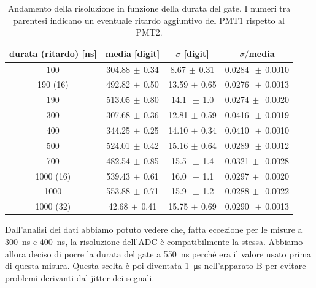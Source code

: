 \begin{table}[h]
\centering
\begin{tabular}{c|c|c|c}
durata (ritardo) [ns] & media [digit] & $\sigma$ [digit] & $\sigma\!/$\!media\\
\hline
 100 &    304.88$\,\pm\,$0.34 &  8.67$\,\pm\,$0.31 & 0.0284 $\,\pm\,$0.0010 \\  
 190 (16)&492.82$\,\pm\,$0.50 & 13.59$\,\pm\,$0.65 & 0.0276 $\,\pm\,$0.0013 \\
 190 &    513.05$\,\pm\,$0.80 & 14.1 $\,\pm\,$1.0 & 0.0274$\,\pm\,$  0.0020 \\
 300 &    307.68$\,\pm\,$0.36 & 12.81$\,\pm\,$0.59 & 0.0416 $\,\pm\,$0.0019 \\
 400 &    344.25$\,\pm\,$0.25 & 14.10$\,\pm\,$0.34 & 0.0410 $\,\pm\,$0.0010 \\
 500 &    524.01$\,\pm\,$0.42 & 15.16$\,\pm\,$0.64 & 0.0289 $\,\pm\,$0.0012 \\
 700 &    482.54$\,\pm\,$0.85 & 15.5 $\,\pm\,$1.4 & 0.0321$\,\pm\,$  0.0028 \\
1000 (16)&539.43$\,\pm\,$0.61 & 16.0 $\,\pm\,$1.1 & 0.0297$\,\pm\,$  0.0020 \\
1000     &553.88$\,\pm\,$0.71 & 15.9 $\,\pm\,$1.2 & 0.0288$\,\pm\,$  0.0022 \\
1000 (32)& 42.68$\,\pm\,$0.41 & 15.75$\,\pm\,$0.69 & 0.0290 $\,\pm\,$0.0013 
\end{tabular}

\caption{Andamento della risoluzione in funzione della durata del gate. I numeri tra parentesi indicano un eventuale ritardo aggiuntivo del PMT1 rispetto al PMT2.}
\label{tab:gate}
\end{table}

Dall'analisi dei dati abbiamo potuto vedere che, fatta eccezione per le misure a \SI{300}{ns} e \SI{400}{ns}, la risoluzione dell'ADC è compatibilmente la stessa.
Abbiamo allora deciso di porre la durata del gate a \SI{550}{ns} perché era il valore usato prima di questa misura.
Questa scelta è poi diventata \SI{1}{\micro s} nell'apparato B per evitare problemi derivanti dal jitter dei segnali.